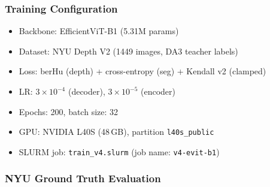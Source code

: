 \documentclass[11pt,a4paper]{article}
\begin{document}
\subsubsection{Training Configuration}

\begin{itemize}[nosep]
  \item Backbone: EfficientViT-B1 (5.31M params)
  \item Dataset: NYU Depth V2 (1449 images, DA3 teacher labels)
  \item Loss: berHu (depth) + cross-entropy (seg) + Kendall v2 (clamped)
  \item LR: $3 \times 10^{-4}$ (decoder), $3 \times 10^{-5}$ (encoder)
  \item Epochs: 200, batch size: 32
  \item GPU: NVIDIA L40S (48\,GB), partition \texttt{l40s\_public}
  \item SLURM job: \texttt{train\_v4.slurm} (job name: \texttt{v4-evit-b1})
\end{itemize}

\subsubsection{NYU Ground Truth Evaluation}
\end{document}

